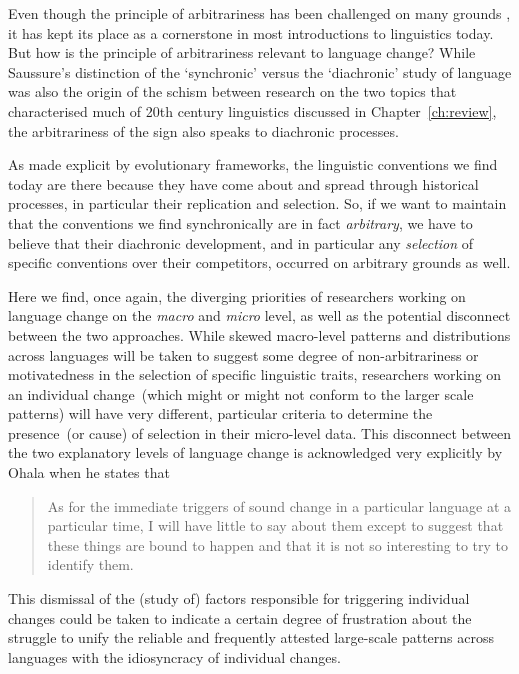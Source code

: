 Even though the principle of arbitrariness has been challenged on many grounds \citep[in particular by work on sound-symbolism, see e.g.][]{Nygaard2009}, it has kept its place as a cornerstone in most introductions to linguistics today. %
But how is the principle of arbitrariness relevant to language change? While Saussure's distinction of the `synchronic' versus the `diachronic' study of language was also the origin of the schism between research on the two topics that characterised much of 20th century linguistics discussed in Chapter~\ref{ch:review}, the arbitrariness of the sign also speaks to diachronic processes.

As made explicit by evolutionary frameworks, the linguistic conventions we find today are there because they have come about and spread through historical processes, in particular their replication and selection. So, if we want to maintain that the conventions we find synchronically are in fact \emph{arbitrary}, we have to believe that their diachronic development, and in particular any \emph{selection} of specific conventions over their competitors, occurred on arbitrary grounds as well.

Here we find, once again, the diverging priorities of researchers working on language change on the \emph{macro} and \emph{micro} level, as well as the potential disconnect between the two approaches. While skewed macro-level patterns and distributions across languages will be taken to suggest some degree of non-arbitrariness or motivatedness in the selection of specific linguistic traits, researchers working on an individual change~(which might or might not conform to the larger scale patterns) will have very different, particular criteria to determine the presence~(or cause) of selection in their micro-level data. This disconnect between the two explanatory levels of language change is acknowledged very explicitly by Ohala when he states that

\begin{quote}
As for the immediate triggers of sound change in a particular language at a particular time, I will have little to say about them except to suggest that these things are bound to happen and that it is not so interesting to try to identify them.~\citep[p.174]{Ohala1989} %
\end{quote}

This dismissal of the (study of) factors responsible for triggering individual changes could be taken to indicate a certain degree of frustration about the struggle to unify the reliable and frequently attested large-scale patterns across languages with the idiosyncracy of individual changes.

